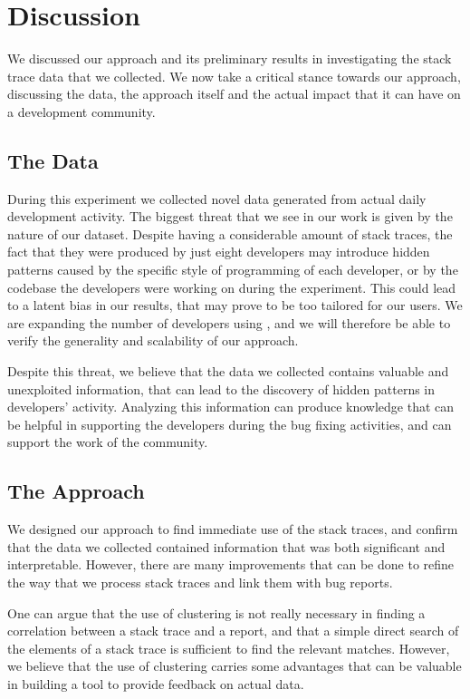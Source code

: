\section{Discussion}\label{sec:stacktraces-discussion}

We discussed our approach and its preliminary results in investigating the stack trace data that we collected.
We now take a critical stance towards our approach, discussing the data, the approach itself and the actual impact that it can have on a development community.


\subsection{The Data}

During this experiment we collected novel data generated from actual daily development activity.
The biggest threat that we see in our work is given by the nature of our dataset.
Despite having a considerable amount of stack traces, the fact that they were produced by just eight developers may introduce hidden patterns caused by the specific style of programming of each developer, or by the codebase the developers were working on during the experiment.
This could lead to a latent bias in our results, that may prove to be too tailored for our users.
We are expanding the number of developers using \slr, and we will therefore be able to verify the generality and scalability of our approach.

Despite this threat, we believe that the data we collected contains valuable and unexploited information, that can lead to the discovery of hidden patterns in developers' activity.
Analyzing this information can produce knowledge that can be helpful in supporting the developers during the bug fixing activities, and can support the work of the community.


\subsection{The Approach}

We designed our approach to find immediate use of the stack traces, and confirm that the data we collected contained information that was both significant and interpretable.
However, there are many improvements that can be done to refine the way that we process stack traces  and link them with bug reports.

One can argue that the use of clustering is not really necessary in finding a correlation between a stack trace and a report, and that a simple direct search of the elements of a stack trace is sufficient to find the relevant matches.
However, we believe that the use of clustering carries some advantages that can be valuable in building a tool to provide feedback on actual data.


